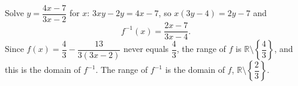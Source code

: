 Solve $y=\dfrac{4x-7}{3x-2}$ for $x$: $3xy-2y=4x-7$, so $x(3y-4)=2y-7$ and
\[f^{-1}(x)=\boxed{\dfrac{2x-7}{3x-4}}.\]
Since $f(x)=\dfrac43-\dfrac{13}{3(3x-2)}$ never equals $\dfrac43$, the range of $f$ is $\mathbb R\setminus\left\{\dfrac43\right\}$, and this is the domain of $f^{-1}$. The range of $f^{-1}$ is the domain of $f$, $\mathbb R\setminus\left\{\dfrac23\right\}$.
